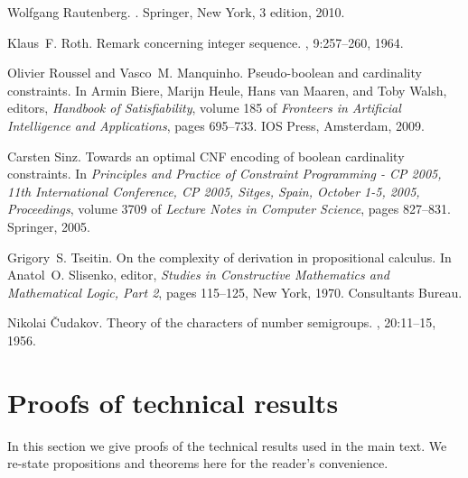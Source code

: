 \documentclass{article} \usepackage[utf8]{inputenc}
\begin{document}
\begin{thebibliography}{}
Wolfgang Rautenberg.
.
\newblock Springer, New York, 3 edition, 2010.

Klaus~F. Roth.
\newblock Remark concerning integer sequence.
, 9:257--260, 1964.

Olivier Roussel and Vasco~M. Manquinho.
\newblock Pseudo-boolean and cardinality constraints.
\newblock In Armin Biere, Marijn Heule, Hans van Maaren, and Toby Walsh,
  editors, {\em Handbook of Satisfiability}, volume 185 of {\em Fronteers in
  Artificial Intelligence and Applications}, pages 695--733. IOS Press,
  Amsterdam, 2009.

Carsten Sinz.
\newblock Towards an optimal {CNF} encoding of boolean cardinality constraints.
\newblock In {\em Principles and Practice of Constraint Programming - CP 2005,
  11th International Conference, CP 2005, Sitges, Spain, October 1-5, 2005,
  Proceedings}, volume 3709 of {\em Lecture Notes in Computer Science}, pages
  827--831. Springer, 2005.

Grigory~S. Tseitin.
\newblock On the complexity of derivation in propositional calculus.
\newblock In Anatol~O. Slisenko, editor, {\em Studies in Constructive
  Mathematics and Mathematical Logic, Part 2}, pages 115--125, New York, 1970.
  Consultants Bureau.

Nikolai \v{C}udakov.
\newblock Theory of the characters of number semigroups.
, 20:11--15, 1956.

\end{thebibliography}
\appendix


\section{Proofs of technical results}\label{sec:proofs}
In this section we give proofs of the technical results used in the main text.
We re-state propositions and theorems here for the reader's convenience.

\smallskip 
\end{document}
